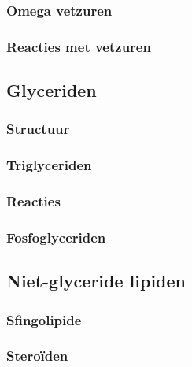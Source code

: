 \documentclass[a4paper,kul]{kulakarticle} %
\begin{document}
\subsubsection{Omega vetzuren}
\subsubsection{Reacties met vetzuren}
\subsection{Glyceriden}
\subsubsection{Structuur}
\subsubsection{Triglyceriden}
\subsubsection{Reacties}
\subsubsection{Fosfoglyceriden}
\subsection{Niet-glyceride lipiden}
\subsubsection{Sfingolipide}
\subsubsection{Steroïden}
\end{document}

